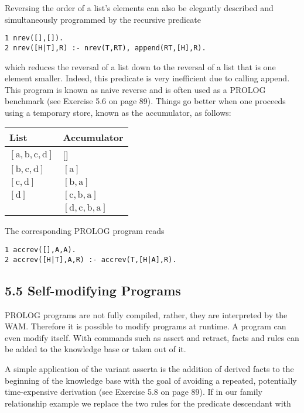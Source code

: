 \documentclass[10pt]{article}
\begin{document}
Reversing the order of a list's elements can also be elegantly described and simultaneously programmed by the recursive predicate

\begin{verbatim}
1 nrev([],[]).
2 nrev([H|T],R) :- nrev(T,RT), append(RT,[H],R).
\end{verbatim}

which reduces the reversal of a list down to the reversal of a list that is one element smaller. Indeed, this predicate is very inefficient due to calling append. This program is known as naive reverse and is often used as a PROLOG benchmark (see Exercise 5.6 on page 89). Things go better when one proceeds using a temporary store, known as the accumulator, as follows:

\begin{center}
\begin{tabular}{ll}
\hline
List & Accumulator \\
\hline
$[\mathrm{a}, \mathrm{b}, \mathrm{c}, \mathrm{d}]$ & [] \\
\hline
$[\mathrm{b}, \mathrm{c}, \mathrm{d}]$ & $[\mathrm{a}]$ \\
\hline
$[\mathrm{c}, \mathrm{d}]$ & $[\mathrm{b}, \mathrm{a}]$ \\
\hline
$[\mathrm{d}]$ & $[\mathrm{c}, \mathrm{b}, \mathrm{a}]$ \\
\hline
[] & $[\mathrm{d}, \mathrm{c}, \mathrm{b}, \mathrm{a}]$ \\
\hline
\end{tabular}
\end{center}

The corresponding PROLOG program reads

\begin{verbatim}
1 accrev([],A,A).
2 accrev([H|T],A,R) :- accrev(T,[H|A],R).
\end{verbatim}

\subsection*{5.5 Self-modifying Programs}
PROLOG programs are not fully compiled, rather, they are interpreted by the WAM. Therefore it is possible to modify programs at runtime. A program can even modify itself. With commands such as assert and retract, facts and rules can be added to the knowledge base or taken out of it.

A simple application of the variant asserta is the addition of derived facts to the beginning of the knowledge base with the goal of avoiding a repeated, potentially time-expensive derivation (see Exercise 5.8 on page 89). If in our family relationship example we replace the two rules for the predicate descendant with
\end{document}
